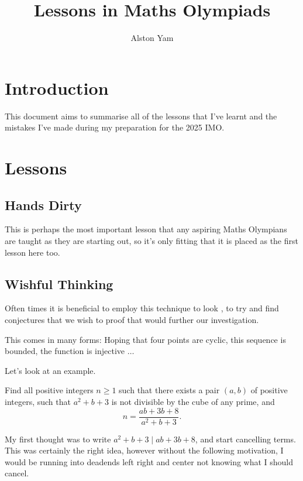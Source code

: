 \documentclass{article}
\title{Lessons in Maths Olympiads}
\author{Alston Yam}
\theoremstyle{mytheoremstyle}
\theoremstyle{mytheoremstyle}
\theoremstyle{myproblemstyle}
\theoremstyle{myproblemstyle}
\begin{document}
    \maketitle
    \parindent=0pt
    \section{Introduction}
    This document aims to summarise all of the lessons that I've learnt and the mistakes I've made during my preparation for the 2025 IMO.

    \section{Lessons}
    \subsection{Hands Dirty}
    This is perhaps the most important lesson that any aspiring Maths Olympians are taught as they are starting out, so it's only fitting that it is placed as the first lesson here too.

    \subsection{Wishful Thinking}
    \vspace{3pt}
    \begin{center}
    \end{center}

    Often times it is beneficial to employ this technique to look , to try and find conjectures that we wish to proof that would further our investigation.

    This comes in many forms: Hoping that four points are cyclic, this sequence is bounded, the function is injective $\dots$

    Let's look at an example.

    \begin{example}[2021 ISL N1]
        Find all positive integers $n\geq1$ such that there exists a pair $(a,b)$ of positive integers, such that $a^2+b+3$ is not divisible by the cube of any prime, and \[ n=\frac{ab+3b+8}{a^2+b+3}. \]
    \end{example}

    My first thought was to write $a^2 + b + 3 \mid ab + 3b + 8$, and start cancelling terms. This was certainly the right idea, however without the following motivation, I would be running into deadends left right and center not knowing what I should cancel.
    
\end{document}
